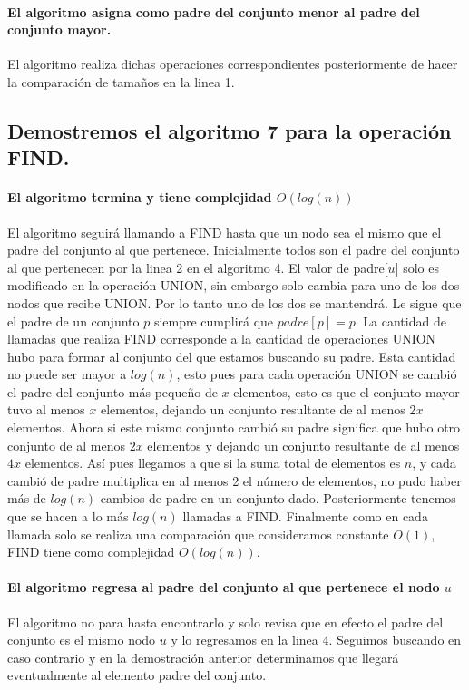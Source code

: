 \documentclass[12pt]{article}
\begin{document}
\paragraph{El algoritmo asigna como padre del conjunto menor al padre del conjunto mayor.}
El algoritmo realiza dichas operaciones correspondientes posteriormente de hacer la comparación de tamaños en la linea 1.
\subsection{Demostremos el algoritmo 7 para la operación FIND.}
\paragraph{El algoritmo termina y tiene complejidad $O(log(n))$} El algoritmo seguirá llamando a FIND hasta que un nodo sea el mismo que el padre del conjunto al que pertenece. Inicialmente todos son el padre del conjunto al que pertenecen por la linea 2 en el algoritmo 4. El valor de padre[$u$] solo es modificado en la operación UNION, sin embargo solo cambia para uno de los dos nodos que recibe UNION. Por lo tanto uno de los dos se mantendrá. Le sigue que el padre de un conjunto $p$ siempre cumplirá que $padre[p] = p$. La cantidad de llamadas que realiza FIND corresponde a la cantidad de operaciones UNION hubo para formar al conjunto del que estamos buscando su padre. Esta cantidad no puede ser mayor a $log(n)$, esto pues para cada operación UNION se cambió el padre del conjunto más pequeño de $x$ elementos, esto es que el conjunto mayor tuvo al menos $x$ elementos, dejando un conjunto resultante de al menos $2x$ elementos. Ahora si este mismo conjunto cambió su padre significa que hubo otro conjunto de al menos $2x$ elementos y dejando un conjunto resultante de al menos $4x$ elementos. Así pues llegamos a que si la suma total de elementos es $n$, y cada cambió de padre multiplica en al menos 2 el número de elementos, no pudo haber más de $log(n)$ cambios de padre en un conjunto dado. Posteriormente tenemos que se hacen a lo más $log(n)$ llamadas a FIND. Finalmente como en cada llamada solo se realiza una comparación que consideramos constante $O(1)$, FIND tiene como complejidad $O(log(n))$.
\paragraph{El algoritmo regresa al padre del conjunto al que pertenece el nodo $u$}
El algoritmo no para hasta encontrarlo y solo revisa que en efecto el padre del conjunto es el mismo nodo $u$ y lo regresamos en la linea 4. Seguimos buscando en caso contrario y en la demostración anterior determinamos que llegará eventualmente al elemento padre del conjunto.
\end{document}
